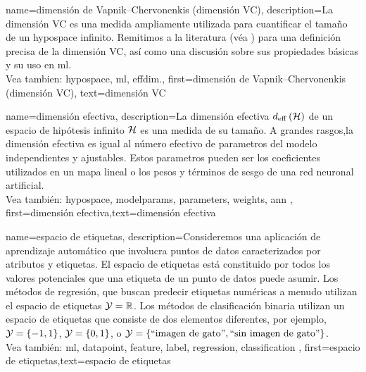 {name={dimensión de Vapnik–Chervonenkis (dimensión VC)},
description={La dimensión VC 
	es una medida ampliamente utilizada para cuantificar el tamaño de un \gls{hypospace} infinito. 
	Remitimos a la literatura (véa \cite{ShalevMLBook}) para una definición precisa 
	de la dimensión VC, así como una discusión sobre sus propiedades básicas y su uso en \gls{ml}.
			\\ 
	Vea tambien: \gls{hypospace}, \gls{ml}, \gls{effdim}.},
first={dimensión de Vapnik–Chervonenkis (dimensión VC)},
text={dimensión VC}  
}


{name={dimensión efectiva},
	description={La dimensión efectiva $d_{\rm eff} \left( \mathcal{H} \right)$ de un 
		espacio de hipótesis infinito $\mathcal{H}$ es una medida de su tamaño. A grandes rasgos,la 
		dimensión efectiva es igual al número efectivo de parametros del modelo independientes y ajustables. 
		Estos parametros pueden ser los coeficientes utilizados en un mapa lineal o los 
		pesos y términos de sesgo de una red neuronal artificial.
		\\
		Vea también: \gls{hypospace}, \gls{modelparams}, \gls{parameters}, \gls{weights}, \gls{ann} },
	first={dimensión efectiva},text={dimensión efectiva}  
}

{name={espacio de etiquetas},
	description={Consideremos una aplicación de aprendizaje automático que involucra puntos de datos caracterizados por atributos
		y etiquetas. El espacio de etiquetas está constituido por todos los valores potenciales que una etiqueta
		de un punto de datos puede asumir. Los métodos de regresión, que buscan predecir etiquetas numéricas 
		a menudo utilizan el espacio de etiquetas $\mathcal{Y} = \mathbb{R}$. Los métodos de clasificación binaria utilizan un espacio de etiquetas  
		que consiste de dos elementos diferentes, por ejemplo, $\mathcal{Y} =\{-1,1\}$, $\mathcal{Y}=\{0,1\}$, 
		o $\mathcal{Y} = \{ \mbox{``imagen de gato''}, \mbox{``sin imagen de gato''} \}$.
		\\
		Vea también: \gls{ml}, \gls{datapoint},  \gls{feature}, \gls{label}, \Gls{regression}, \gls{classification} }, 
		first={espacio de etiquetas},text={espacio de etiquetas}  
}


